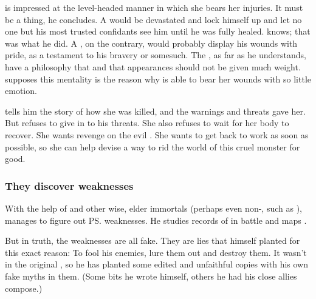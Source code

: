 \Teshrial is impressed at the level-headed manner in which she bears her injuries. 
It must be a \TiphredSerah thing, he concludes. 
A \CiriathSepher would be devastated and lock himself up and let no one but his most trusted confidants see him until he was fully healed. 
\Teshrial knows; that was what he did.
A \Mystraacht, on the contrary, would probably display his wounds with pride, as a testament to his bravery or somesuch. 
The \TiphredSerah, as far as he understands, have a philosophy that  and that appearances should not be given much weight. 
\Teshrial supposes this mentality is the reason why \Urizeth is able to bear her wounds with so little emotion. 

\Urizeth{} tells him the story of how she was killed, and the warnings and threats \Ishnaruchaefir{} gave her. 
But \Urizeth{} refuses to give in to his threats. 
She also refuses to wait for her body to recover. 
She wants revenge on the evil \dragon. 
She wants to get back to work as soon as possible, so she can help \Teshrial{} devise a way to rid the world of this cruel monster for good. 






\subsubsection{They discover weaknesses}
With the help of \Urizeth{} and other wise, elder immortals (perhaps even non-\resphain, such as \quiljaaran), \Teshrial{} manages to figure out \ps{\Ishnaruchaefir} weaknesses. 
He studies records of \Ishnaruchaefir{} in battle and maps . 

But in truth, the weaknesses are all fake. 
They are lies that \Ishnaruchaefir{} himself planted for this exact reason: 
To fool his enemies, lure them out and destroy them. 
It wasn't in the original \emph{}, so he has planted some edited and unfaithful copies with his own fake myths in them.
(Some bits he wrote himself, others he had his close allies compose.) 

